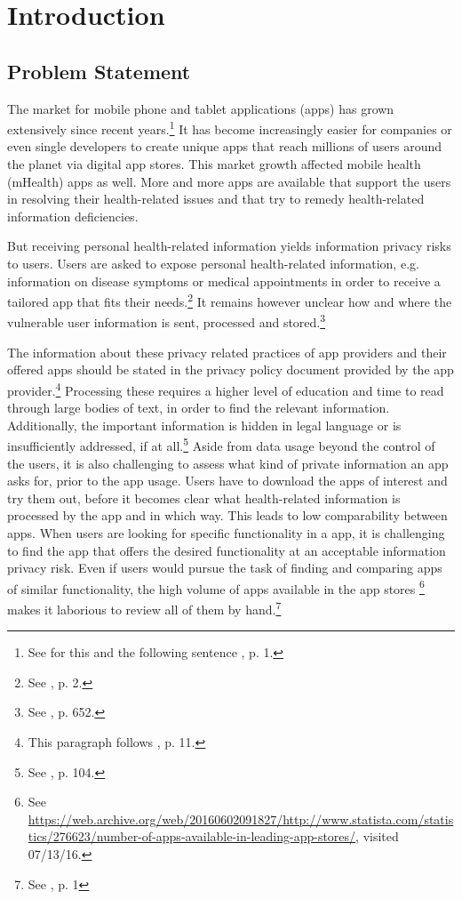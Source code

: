 \section{Introduction}

\subsection{Problem Statement}

The market for mobile phone and tablet applications (apps) has grown extensively since recent years.\footnote{See for this and the following sentence \cite{Enck2011}, p. 1.}
It has become increasingly easier for companies or even single developers to create unique apps that reach millions of users around the planet via digital app stores.
This market growth affected mobile health (\acs{mHealth}) apps as well. 
More and more \mH apps are available that support the users in resolving their health-related issues and that try to remedy health-related information deficiencies. 

But receiving personal health-related information yields information privacy risks to users.
Users are asked to expose personal health-related information, e.g. information on disease symptoms or medical appointments in order to receive a tailored app that fits their needs.\footnote{See \cite{Chen2012}, p. 2.}
It remains however unclear how and where the vulnerable user information is sent, processed and stored.\footnote{See \cite{He2014}, p. 652.}

The information about these privacy related practices of app providers and their offered apps should be stated in the privacy policy document provided by the app provider.\footnote{This paragraph follows \cite{Dehling2014}, p. 11.}
Processing these \pps requires a higher level of education and time to read through large bodies of text, in order to find the relevant information. 
Additionally, the important information is hidden in legal language or is  insufficiently addressed, if at all.\footnote{See \cite{Pollach2007}, p. 104.}
Aside from data usage beyond the control of the users, it is also challenging to assess what kind of private information an app asks for, prior to the app usage. 
Users have to download the apps of interest and try them out, before it becomes clear what health-related information is processed by the app and in which  way. 
This leads to low comparability between apps. 
When users are looking for specific functionality in a \mH app, it is challenging to find the app that offers the desired functionality at an acceptable information privacy risk. 
Even if users would pursue the task of finding and comparing \mH apps of similar functionality, the high volume of apps available in the app stores \footnote{\raggedright See \url{https://web.archive.org/web/20160602091827/http://www.statista.com/statistics/276623/number-of-apps-available-in-leading-app-stores/}, visited 07/13/16.} makes it laborious to review all of them by hand.\footnote{See \cite{Enck2011}, p. 1}

